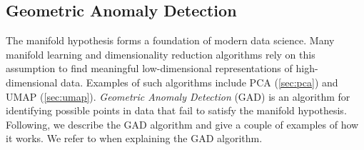 \subsection{Geometric Anomaly Detection}
\label{sec:geometric-anomaly-detection}
The manifold hypothesis forms a foundation of modern data science. Many manifold learning and dimensionality reduction algorithms rely on this assumption to find meaningful low-dimensional representations of high-dimensional data. Examples of such algorithms include PCA (\cref{sec:pca}) and UMAP (\cref{sec:umap}). \textit{Geometric Anomaly Detection} (GAD) \cite{stolz2020geometric} is an algorithm for identifying possible points in data that fail to satisfy the manifold hypothesis. Following, we describe the GAD algorithm and give a couple of examples of how it works. We refer to \cite{stolz2020geometric} when explaining the GAD algorithm.

